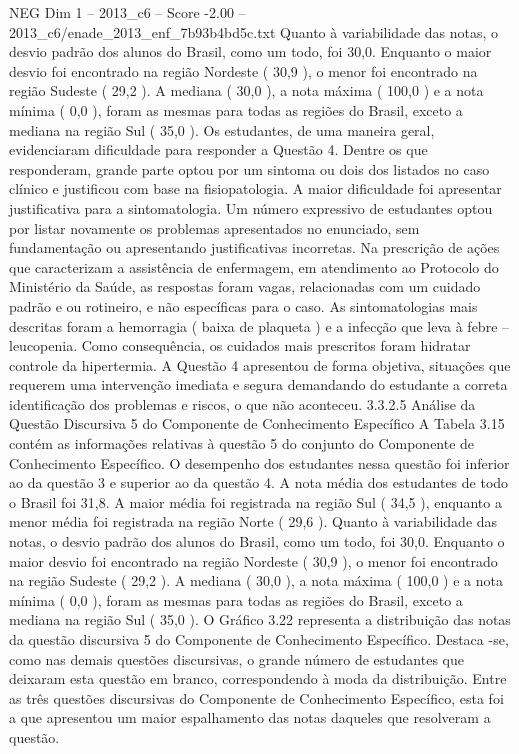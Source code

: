 \begin{textsample}{NEG Dim 1 – 2013\_c6 – Score -2.00 – 2013\_c6/enade\_2013\_enf\_7b93b4bd5c.txt}
Quanto à variabilidade das notas, o desvio padrão dos alunos do Brasil, como um todo, foi 30,0.
Enquanto o maior desvio foi encontrado na região Nordeste ( 30,9 ), o menor foi encontrado na região Sudeste ( 29,2 ).
A mediana ( 30,0 ), a nota máxima ( 100,0 ) e a nota mínima ( 0,0 ), foram as mesmas para todas as regiões do Brasil, exceto a mediana na região Sul ( 35,0 ).
Os estudantes, de uma maneira geral, evidenciaram dificuldade para responder a Questão 4.
Dentre os que responderam, grande parte optou por um sintoma ou dois dos listados no caso clínico e justificou com base na fisiopatologia.
A maior dificuldade foi apresentar justificativa para a sintomatologia.
Um número expressivo de estudantes optou por listar novamente os problemas apresentados no enunciado, sem fundamentação ou apresentando justificativas incorretas.
Na prescrição de ações que caracterizam a assistência de enfermagem, em atendimento ao Protocolo do Ministério da Saúde, as respostas foram vagas, relacionadas com um cuidado padrão e ou rotineiro, e não específicas para o caso.
As sintomatologias mais descritas foram a hemorragia ( baixa de plaqueta ) e a infecção que leva à febre – leucopenia.
Como consequência, os cuidados mais prescritos foram hidratar controle da hipertermia.
A Questão 4 apresentou de forma objetiva, situações que requerem uma intervenção imediata e segura demandando do estudante a correta identificação dos problemas e riscos, o que não aconteceu. 3.3.2.5 Análise da Questão Discursiva 5 do Componente de Conhecimento Específico A Tabela 3.15 contém as informações relativas à questão 5 do conjunto do Componente de Conhecimento Específico.
O desempenho dos estudantes nessa questão foi inferior ao da questão 3 e superior ao da questão 4.
A nota média dos estudantes de todo o Brasil foi 31,8.
A maior média foi registrada na região Sul ( 34,5 ), enquanto a menor média foi registrada na região Norte ( 29,6 ).
Quanto à variabilidade das notas, o desvio padrão dos alunos do Brasil, como um todo, foi 30,0.
Enquanto o maior desvio foi encontrado na região Nordeste ( 30,9 ), o menor foi encontrado na região Sudeste ( 29,2 ).
A mediana ( 30,0 ), a nota máxima ( 100,0 ) e a nota mínima ( 0,0 ), foram as mesmas para todas as regiões do Brasil, exceto a mediana na região Sul ( 35,0 ).
O Gráfico 3.22 representa a distribuição das notas da questão discursiva 5 do Componente de Conhecimento Específico.
Destaca -se, como nas demais questões discursivas, o grande número de estudantes que deixaram esta questão em branco, correspondendo à moda da distribuição.
Entre as três questões discursivas do Componente de Conhecimento Específico, esta foi a que apresentou um maior espalhamento das notas daqueles que resolveram a questão.

\end{textsample}
